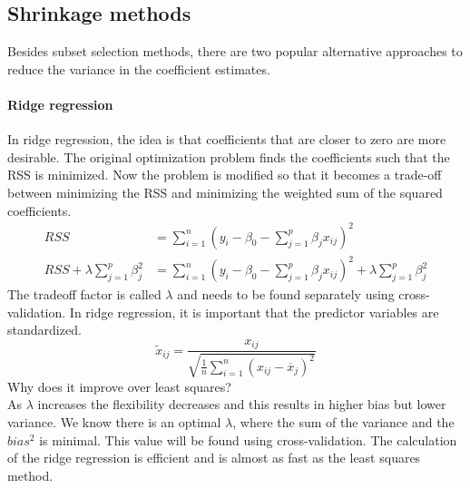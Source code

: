 \documentclass[../document.tex]{subfiles}
\begin{document}
	\subsection{Shrinkage methods}
	Besides subset selection methods, there are two popular alternative approaches to reduce the variance in the coefficient estimates.

	\paragraph{Ridge regression}
	In ridge regression, the idea is that coefficients that are closer to zero are more desirable. The original optimization problem finds the coefficients such that the RSS is minimized. Now the problem is modified so that it becomes a trade-off between minimizing the RSS and minimizing the weighted sum of the squared coefficients.
	\begin{equation}
	\begin{split}
		RSS &= \sum_{i=1}^{n}(y_{i}-\beta_{0}-\sum_{j=1}^{p}\beta_{j}x_{ij})^2\\
		RSS+\lambda\sum_{j=1}^{p}\beta_{j}^2 &= \sum_{i=1}^{n}(y_{i}-\beta_{0}-\sum_{j=1}^{p}\beta_{j}x_{ij})^2+\lambda\sum_{j=1}^{p}\beta_{j}^2
	\end{split}
	\end{equation}
	The tradeoff factor is called \(\lambda\) and needs to be found separately using cross-validation. In ridge regression, it is important that the predictor variables are standardized.
	\begin{equation}
		\tilde{x}_{ij}=\frac{x_{ij}}{\sqrt{\frac{1}{n}\sum_{i=1}^{n}(x_{ij}-\overline{x}_{j})^2}}
	\end{equation}
	Why does it improve over least squares?\\
	As \(\lambda\) increases the flexibility decreases and this results in higher bias but lower variance. We know there is an optimal \(\lambda\), where the sum of the variance and the \(bias^2\) is minimal. This value will be found using cross-validation. The calculation of the ridge regression is efficient and is almost as fast as the least squares method.
\end{document}
